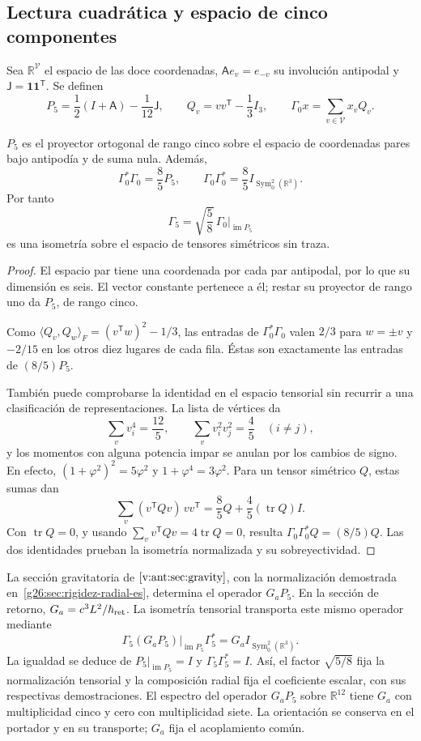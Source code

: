 \subsection{Lectura cuadrática y espacio de cinco componentes}
Sea \(\mathbb R^{\mathcal V}\) el espacio de las doce coordenadas,
\(\mathsf A e_v=e_{-v}\) su involución antipodal y
\(\mathsf J=\mathbf1\mathbf1^{\mathsf T}\). Se definen
\[
 P_5=\frac12(I+\mathsf A)-\frac1{12}\mathsf J,\qquad
 Q_v=vv^{\mathsf T}-\frac13I_3,\qquad
 \Gamma_0x=\sum_{v\in\mathcal V}x_vQ_v.
\]
\begin{theorem}
\label{vii:thm:portador-pentacomponente}
\(P_5\) es el proyector ortogonal de rango cinco sobre el espacio de
coordenadas pares bajo antipodía y de suma nula. Además,
\[
 \Gamma_0^*\Gamma_0=\frac85P_5,\qquad
 \Gamma_0\Gamma_0^*=\frac85I_{\operatorname{Sym}^2_0(\mathbb R^3)}.
\]
Por tanto
\[
 \Gamma_5=\sqrt{\frac58}\,\Gamma_0|_{\operatorname{im}P_5}
\]
es una isometría sobre el espacio de tensores simétricos sin traza.
\end{theorem}
\begin{proof}
El espacio par tiene una coordenada por cada par antipodal, por lo que
su dimensión es seis. El vector constante pertenece a él; restar su
proyector de rango uno da \(P_5\), de rango cinco.

Como
\(\langle Q_v,Q_w\rangle_F=(v^{\mathsf T}w)^2-1/3\), las entradas
de \(\Gamma_0^*\Gamma_0\) valen \(2/3\) para \(w=\pm v\) y
\(-2/15\) en los otros diez lugares de cada fila. Éstas son
exactamente las entradas de \((8/5)P_5\).

También puede comprobarse la identidad en el espacio tensorial sin
recurrir a una clasificación de representaciones. La lista de vértices da
\[
 \sum_vv_i^4=\frac{12}{5},\qquad
 \sum_vv_i^2v_j^2=\frac45\quad(i\ne j),
\]
y los momentos con alguna potencia impar se anulan por los cambios de
signo. En efecto,
\((1+\varphi^2)^2=5\varphi^2\) y \(1+\varphi^4=3\varphi^2\).
Para un tensor simétrico \(Q\), estas sumas dan
\[
 \sum_v(v^{\mathsf T}Qv)\,vv^{\mathsf T}
 =\frac85Q+\frac45(\operatorname{tr}Q)I.
\]
Con \(\operatorname{tr}Q=0\), y usando
\(\sum_vv^{\mathsf T}Qv=4\operatorname{tr}Q=0\), resulta
\(\Gamma_0\Gamma_0^*Q=(8/5)Q\). Las dos identidades prueban
la isometría normalizada y su sobreyectividad.
\end{proof}

La sección gravitatoria de \(\ref{v:ant:sec:gravity}\), con la
normalización demostrada en~\ref{g26:sec:rigidez-radial-es}, determina
el operador \(G_aP_5\). En la sección de retorno,
\(G_a=c^3L^2/\hbar_{\rm ret}\). La isometría tensorial transporta
este mismo operador mediante
\[
 \Gamma_5(G_aP_5)|_{\operatorname{im}P_5}\Gamma_5^*
   =G_a I_{\operatorname{Sym}^2_0(\mathbb R^3)}.
\]
La igualdad se deduce de \(P_5|_{\operatorname{im}P_5}=I\) y
\(\Gamma_5\Gamma_5^*=I\). Así, el factor \(\sqrt{5/8}\) fija la
normalización tensorial y la composición radial fija el coeficiente
escalar, con sus respectivas demostraciones.
El espectro del operador \(G_aP_5\) sobre \(\mathbb R^{12}\)
tiene \(G_a\) con multiplicidad
cinco y cero con multiplicidad siete. La orientación se conserva en
el portador y en su transporte; \(G_a\) fija el acoplamiento común.

